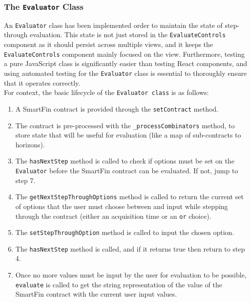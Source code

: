 \subsubsection{The \texttt{Evaluator} Class} \label{evaluator}

An \texttt{Evaluator} class has been implemented order to maintain the state of step-through evaluation. This state is not just stored in the \texttt{EvaluateControls} component as it should persist across multiple views, and it keeps the \texttt{EvaluateControls} component mainly focused on the view. Furthermore, testing a pure JavaScript class is significantly easier than testing React components, and using automated testing for the \texttt{Evaluator} class is essential to thoroughly ensure that it operates correctly. \\

For context, the basic lifecycle of the \texttt{Evaluator class} is as follows: \\

\begin{enumerate}
    \item A SmartFin contract is provided through the \texttt{setContract} method.
    \item The contract is pre-processed with the \texttt{\_processCombinators} method, to store state that will be useful for evaluation (like a map of sub-contracts to horizons).
    \item The \texttt{hasNextStep} method is called to check if options must be set on the \texttt{Evaluator} before the SmartFin contract can be evaluated. If not, jump to step 7.
    \item The \texttt{getNextStepThroughOptions} method is called to return the current set of options that the user must choose between and input while stepping through the contract (either an acquisition time or an \texttt{or} choice).
    \item The \texttt{setStepThroughOption} method is called to input the chosen option.
    \item The \texttt{hasNextStep} method is called, and if it returns true then return to step 4.
    \item Once no more values must be input by the user for evaluation to be possible, \texttt{evaluate} is called to get the string representation of the value of the SmartFin contract with the current user input values. \\
\end{enumerate}

